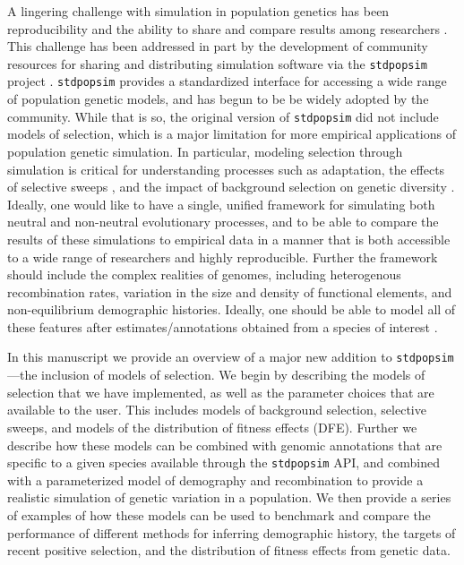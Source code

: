 \documentclass[hidelinks]{article}
\newcommand{\stdpopsim}{\texttt{stdpopsim}\xspace}
\begin{document}
    A lingering challenge with simulation in population genetics has been
    reproducibility and the ability to share and compare results among 
    researchers \citep[e.g.,][]{ragsdale2020lessons}.
    This challenge has been addressed in part by the development
    of community resources for sharing and distributing simulation software
    via the \stdpopsim project \citep{adrion2020community}. \stdpopsim
    provides a standardized interface for accessing a wide range of
    population genetic models, and has begun to be be widely adopted by the community. %
    While that is so, the original version of \stdpopsim did not include
    models of selection, which is a major limitation for more empirical
    applications of population genetic simulation. In particular, modeling selection
    through simulation is critical for understanding processes such
    as adaptation, the effects of selective sweeps \citep[e.g.][]{braverman1995hitchhiking,fay2000hitchhiking,przeworski2002signature,przeworski2005signature,schrider2015soft}, and the impact of
    background selection on genetic diversity
    \citep[e.g.][]{charlesworth1993effect,charlesworth1995pattern,williamson2002genealogy,ewing2016consequences,torres2020temporal}.
    Ideally, one would like
    to have a single, unified framework for simulating both neutral and
    non-neutral evolutionary processes, and to be able to compare the
    results of these simulations to empirical data in a manner that is
    both accessible to a wide range of researchers and highly reproducible. 
    Further the framework should include the complex realities of 
    genomes, including heterogenous recombination rates, 
    variation in the size and density of functional elements, and
    non-equilibrium demographic histories. Ideally, one should be able
    to model all of these features after estimates/annotations obtained
    from a species of interest \citep[e.g.][]{schrider2020background}.

    In this manuscript we provide an overview of a major new addition
    to \stdpopsim---the inclusion of models of selection.
    We begin by describing the models of selection that we have implemented,
    as well as the parameter choices that are available to the user.
    This includes models of background selection, selective sweeps, and
    models of the distribution of fitness effects (DFE).
    Further we describe how these models can be combined with genomic
    annotations that are specific to a given species available
    through the \stdpopsim API, and combined with a parameterized model of
    demography and recombination to provide a realistic simulation of
    genetic variation in a population.
    We then provide a series of examples of how these models can be used
    to benchmark and compare the performance of different methods for
    inferring demographic history, the targets of recent positive selection,
    and the distribution of fitness effects from genetic data. 
\end{document}
